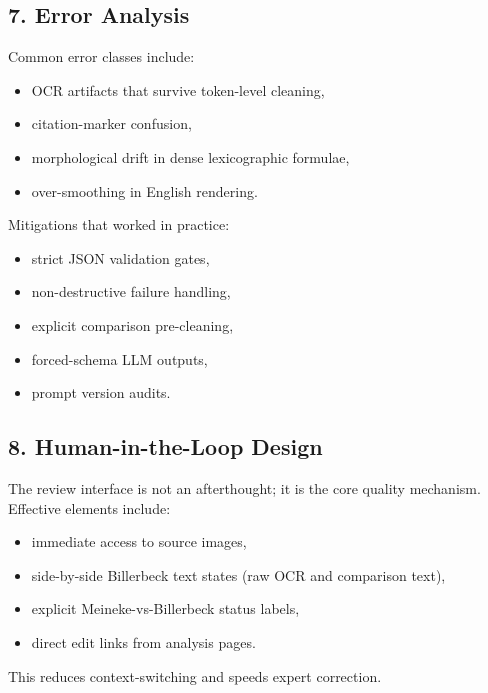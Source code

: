 \documentclass[
]{article}
\providecommand{\tightlist}{%
  \setlength{\itemsep}{0pt}\setlength{\parskip}{0pt}}
\begin{document}
\hypertarget{7-error-analysis}{%
\subsection{7. Error Analysis}\label{7-error-analysis}}

Common error classes include:

\begin{itemize}
\tightlist
\item
  OCR artifacts that survive token-level cleaning,
\item
  citation-marker confusion,
\item
  morphological drift in dense lexicographic formulae,
\item
  over-smoothing in English rendering.
\end{itemize}

Mitigations that worked in practice:

\begin{itemize}
\tightlist
\item
  strict JSON validation gates,
\item
  non-destructive failure handling,
\item
  explicit comparison pre-cleaning,
\item
  forced-schema LLM outputs,
\item
  prompt version audits.
\end{itemize}

\hypertarget{8-human-in-the-loop-design}{%
\subsection{8. Human-in-the-Loop
Design}\label{8-human-in-the-loop-design}}

The review interface is not an afterthought; it is the core quality
mechanism. Effective elements include:

\begin{itemize}
\tightlist
\item
  immediate access to source images,
\item
  side-by-side Billerbeck text states (raw OCR and comparison text),
\item
  explicit Meineke-vs-Billerbeck status labels,
\item
  direct edit links from analysis pages.
\end{itemize}

This reduces context-switching and speeds expert correction.
\end{document}
